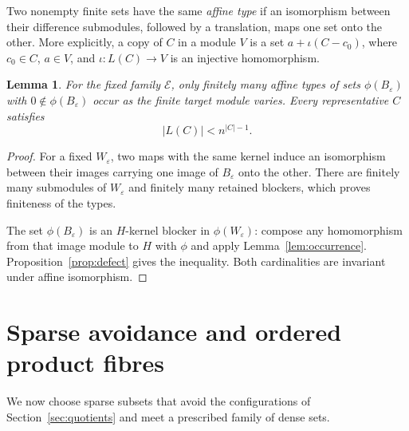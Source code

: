 \documentclass[10pt,a4paper]{amsart}
\newtheorem{lemma}[theorem]{Lemma}
\numberwithin{equation}{section}
\newcommand{\calE}{\mathcal{E}}
\begin{document}
Two nonempty finite sets have the same \emph{affine type} if an isomorphism between their difference submodules, followed by a translation, maps one set onto the other. More explicitly, a copy of $C$ in a module $V$ is a set $a+\iota(C-c_0)$, where $c_0\in C$, $a\in V$, and $\iota:L(C)\to V$ is an injective homomorphism.

\begin{lemma}\label{lem:types}
For the fixed family $\calE$, only finitely many affine types of sets $\phi(B_\varepsilon)$ with $0\notin\phi(B_\varepsilon)$ occur as the finite target module varies. Every representative $C$ satisfies
\[
 |L(C)|<n^{|C|-1}.
\]
\end{lemma}
\begin{proof}
For a fixed $W_\varepsilon$, two maps with the same kernel induce an isomorphism between their images carrying one image of $B_\varepsilon$ onto the other. There are finitely many submodules of $W_\varepsilon$ and finitely many retained blockers, which proves finiteness of the types.

The set $\phi(B_\varepsilon)$ is an $H$-kernel blocker in $\phi(W_\varepsilon)$: compose any homomorphism from that image module to $H$ with $\phi$ and apply Lemma~\ref{lem:occurrence}. Proposition~\ref{prop:defect} gives the inequality. Both cardinalities are invariant under affine isomorphism.
\end{proof}

\section{Sparse avoidance and ordered product fibres}\label{sec:sparse}
We now choose sparse subsets that avoid the configurations of Section~\ref{sec:quotients} and meet a prescribed family of dense sets.
\end{document}
